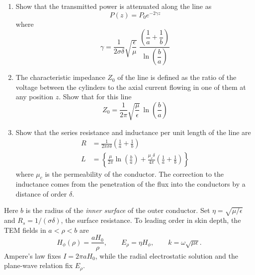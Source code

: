\begin{center}
\end{center}

\begin{enumerate}
\item[(b)] Show that the transmitted power is attenuated along the line as
\[
P(z)=P_{0}e^{-2\gamma z}
\]
where
\[
\gamma=\frac{1}{2\sigma\delta}\sqrt{\frac{\epsilon}{\mu}}\;
\frac{\left(\dfrac{1}{a}+\dfrac{1}{b}\right)}{\ln\left(\dfrac{b}{a}\right)}
\]
\item[(c)] The characteristic impedance $Z_{0}$ of the line is defined as the ratio of the voltage between the cylinders to the axial current flowing in one of them at any position $z$. Show that for this line
\[
Z_{0}=\frac{1}{2\pi}\sqrt{\frac{\mu}{\epsilon}}\,\ln\!\left(\frac{b}{a}\right)
\]
\item[(d)] Show that the series resistance and inductance per unit length of the line are
\begin{align*}
R&=\frac{1}{2\pi\sigma\delta}\left(\frac{1}{a}+\frac{1}{b}\right)\\
L&=\left\{\frac{\mu}{2\pi}\ln\!\left(\frac{b}{a}\right)+\frac{\mu_{c}\delta}{4\pi}\left(\frac{1}{a}+\frac{1}{b}\right)\right\}
\end{align*}
where $\mu_{c}$ is the permeability of the conductor. The correction to the inductance comes from the penetration of the flux into the conductors by a distance of order $\delta$.
\end{enumerate}
\solution

Here $b$ is the radius of the \emph{inner surface} of the outer
conductor.  Set $\eta=\sqrt{\mu/\epsilon}$ and
$R_s=1/(\sigma\delta)$, the surface resistance.  To leading order
in skin depth, the TEM fields in $a<\rho<b$ are
\[
H_\phi(\rho)=\frac{aH_0}{\rho},\qquad E_\rho=\eta H_\phi,
\qquad k=\omega\sqrt{\mu\epsilon}.
\]
Ampere's law fixes $I=2\pi aH_0$, while the radial electrostatic
solution and the plane-wave relation fix $E_\rho$.

